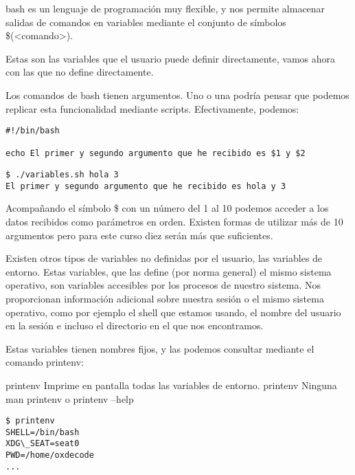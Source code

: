 bash es un lenguaje de programación muy flexible, y nos permite almacenar salidas de comandos en variables mediante el conjunto de símbolos \$(<comando>).

Estas son las variables que el usuario puede definir directamente, vamos ahora con las que no define directamente.

Los comandos de bash tienen argumentos. Uno o una podría pensar que podemos replicar esta funcionalidad mediante scripts. Efectivamente, podemos:

\begin{tcolorbox-code}
\begin{lstlisting}
#!/bin/bash

echo El primer y segundo argumento que he recibido es $1 y $2 
\end{lstlisting}
\end{tcolorbox-code}

\begin{tcolorbox-code}
\begin{lstlisting}
$ ./variables.sh hola 3
El primer y segundo argumento que he recibido es hola y 3
\end{lstlisting}
\end{tcolorbox-code}

Acompañando el símbolo \$ con un número del 1 al 10 podemos acceder a los datos recibidos como parámetros en orden. Existen formas de utilizar más de 10 argumentos pero para este curso diez serán más que suficientes.

Existen otros tipos de variables no definidas por el usuario, las variables de entorno. Estas variables, que las define (por norma general) el mismo sistema operativo, son variables accesibles por los procesos de nuestro sistema. Nos proporcionan información adicional sobre nuestra sesión o el mismo sistema operativo, como por ejemplo el shell que estamos usando, el nombre del usuario en la sesión e incluso el directorio en el que nos encontramos.

Estas variables tienen nombres fijos, y las podemos consultar mediante el comando printenv:

\begin{command-info}
{printenv}
{Imprime en pantalla todas las variables de entorno.}
{printenv}
{Ninguna}
{man printenv o printenv --help}
\end{command-info}

\begin{tcolorbox-code}
\begin{lstlisting}
$ printenv
SHELL=/bin/bash
XDG\_SEAT=seat0
PWD=/home/oxdecode
...
\end{lstlisting}
\end{tcolorbox-code}

